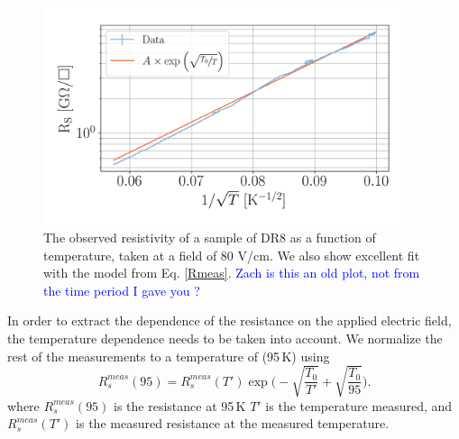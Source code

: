 \documentclass[a4paper,12pt]{article}
\newcommand{\RI}[1]{\textcolor{blue}{#1}}
\begin{document}
\begin{figure}
    \centering
    \includegraphics[width=0.95\textwidth]{Results_figs/temp_sheetRes_dr8_cooldown.png}
    \caption{The observed resistivity of a sample of DR8 as a function of temperature, taken at a field of 80 V/cm. We also show excellent fit with the model from Eq. \ref{Rmeas}. \RI{Zach is this an old plot, not from the time period I gave you ?}}
    \label{fig:cooldown}
\end{figure}
In order to extract the dependence of the resistance on the applied electric field, the temperature dependence needs to be taken into account. We normalize the rest of the measurements to a temperature of (95\,K) using 
\begin{equation}
R_{s}^{meas}(95)=R_{s}^{meas}(T')\exp\bigg(-\sqrt{\frac{T_0}{T'}}+\sqrt{\frac{T_0}{95}}\bigg).
\end{equation}
where $R_s^{meas}(95)$ is the resistance at 95\,K $T'$ is the temperature measured, and $R_{s}^{meas}(T')$ is the measured resistance at the measured temperature. 
\end{document}
